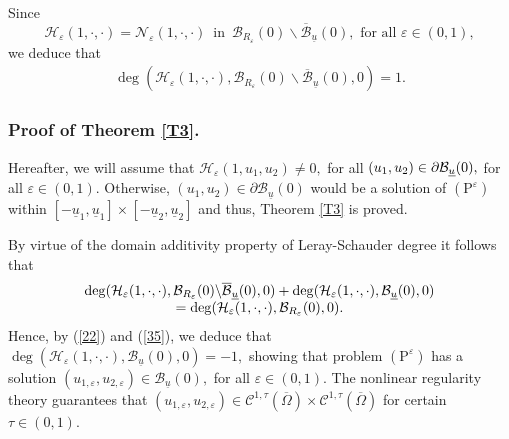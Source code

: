 \documentclass[11pt]{amsart}
\theoremstyle{definition}
\theoremstyle{remark}
\numberwithin{equation}{section}
\begin{document}
Since 
\begin{equation*}
\mathcal{H}_{\varepsilon }(1,\cdot ,\cdot )=\mathcal{N}_{\varepsilon
}(1,\cdot ,\cdot )\,\,\,\text{in}\,\,\,\mathcal{B}_{R_{\varepsilon
}}(0)\backslash \overline{\mathcal{B}}_{\underline{u}}(0),\text{ for all }%
\varepsilon \in (0,1),
\end{equation*}%
we deduce that 
\begin{equation}
\begin{array}{c}
\deg (\mathcal{H}_{\varepsilon }(1,\cdot ,\cdot ),\mathcal{B}%
_{R_{\varepsilon }}(0)\backslash \overline{\mathcal{B}}_{\underline{u}%
}(0),0)=1.%
\end{array}
\label{35}
\end{equation}

\subsubsection{\textbf{Proof of Theorem \protect\ref{T3}.}}

Hereafter, we will assume that $\mathcal{H}_{\varepsilon
}(1,u_{1},u_{2})\not=0,$ for all $(u_{1},u_{2})\in \partial \mathcal{B}_{%
\underline{u}}(0),$ for all $\varepsilon \in (0,1).$ Otherwise, $%
(u_{1},u_{2})\in \partial \mathcal{B}_{\underline{u}}(0)$ would be a
solution of $(\mathrm{P}^{\varepsilon })$ within $\left[ -\underline{u}_{1},%
\underline{u}_{1}\right] \times \left[ -\underline{u}_{2},\underline{u}_{2}%
\right] $ and thus, Theorem \ref{T3} is proved.

By virtue of the domain additivity property of Leray-Schauder degree it
follows that 
\begin{equation*}
\begin{array}{c}
\deg (\mathcal{H}_{\varepsilon }(1,\cdot ,\cdot ),\mathcal{B}%
_{R_{\varepsilon }}(0)\backslash \overline{\mathcal{B}}_{\underline{u}%
}(0),0)+\deg (\mathcal{H}_{\varepsilon }(1,\cdot ,\cdot ),\mathcal{B}_{%
\underline{u}}(0),0) \\ 
=\deg (\mathcal{H}_{\varepsilon }(1,\cdot ,\cdot ),\mathcal{B}%
_{R_{\varepsilon }}(0),0).%
\end{array}%
\end{equation*}%
Hence, by (\ref{22}) and (\ref{35}), we deduce that $\deg (\mathcal{H}%
_{\varepsilon }(1,\cdot ,\cdot ),\mathcal{B}_{\underline{u}}(0),0)=-1,$
showing that problem $(\mathrm{P}^{\varepsilon })$ has a solution $%
(u_{1,\varepsilon },u_{2,\varepsilon })\in \mathcal{B}_{\underline{u}}(0),$
for all $\varepsilon \in (0,1)$. The nonlinear regularity theory \cite{L}
guarantees that $(u_{1,\varepsilon },u_{2,\varepsilon })\in \mathcal{C}%
^{1,\tau }(\overline{\Omega })\times \mathcal{C}^{1,\tau }(\overline{\Omega }%
)$ for certain $\tau \in (0,1)$.
\end{document}
